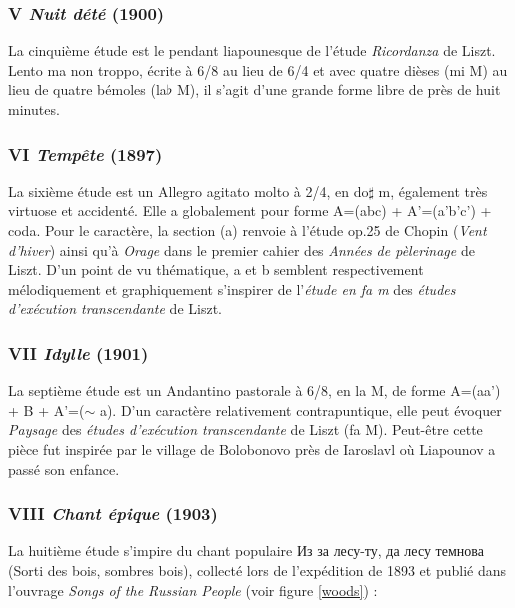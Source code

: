 \subsubsection{V \emph{Nuit dété} (1900)}

La cinquième étude est le pendant liapounesque de l'étude \emph{Ricordanza} de Liszt. Lento ma non troppo, écrite à 6/8 au lieu de 6/4 et avec quatre dièses (mi M) au lieu de quatre bémoles (la$\flat$ M), il s'agit d'une grande forme libre de près de huit minutes.

\subsubsection{VI \emph{Tempête} (1897)}

La sixième étude est un Allegro agitato molto à 2/4, en do$\sharp$ m, également très virtuose et accidenté. Elle a globalement pour forme A=(abc) + A'=(a'b'c') + coda. Pour le caractère, la section (a) renvoie à l'étude  op.25 de Chopin (\emph{Vent d'hiver}) ainsi qu'à \emph{Orage} dans le premier cahier des \emph{Années de pèlerinage} de Liszt. D'un point de vu thématique, a et b semblent respectivement mélodiquement et graphiquement s'inspirer de l'\emph{étude en fa m} des \emph{études d'exécution transcendante} de Liszt.

\subsubsection{VII \emph{Idylle} (1901)}

La septième étude est un Andantino pastorale à 6/8, en la M, de forme A=(aa') + B + A'=($\sim$ a). D'un caractère relativement contrapuntique, elle peut évoquer \emph{Paysage} des \emph{études d'exécution transcendante} de Liszt (fa M). Peut-être cette pièce fut inspirée par le village de Bolobonovo près de Iaroslavl où Liapounov a passé son enfance.

\subsubsection{VIII \emph{Chant épique} (1903)}

La huitième étude s'impire du chant populaire \foreignlanguage{russian}{Из за лесу-ту, да лесу темнова} (Sorti des bois, sombres bois), collecté lors de l'expédition de 1893 et publié dans l'ouvrage \emph{Songs of the Russian People} (voir figure \ref{woods}) :\\

